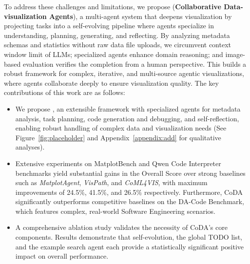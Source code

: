 To address these challenges and limitations, we propose \methodname{} (\textbf{\textcolor{StarIndigo}{Collaborative} \textcolor{StarCoral}{Data-visualization} \textcolor{StarTeal}{Agents}}), a multi-agent system that deepens visualization by projecting tasks into a self-evolving pipeline where agents specialize in understanding, planning, generating, and reflecting. 
By analyzing metadata schemas and statistics without raw data file uploads, we circumvent context window limit of LLMs; specialized agents enhance domain reasoning; and image-based evaluation verifies the completion from a human perspective. This builds a robust framework for complex, iterative, and multi-source agentic visualizations, where agents collaborate deeply to ensure visualization quality.
The key contributions of this work are as follows:
\begin{itemize}[itemsep=0pt, parsep=0pt, topsep=0pt, leftmargin=2em]
    \item We propose \methodname{}, an extensible framework with specialized agents for metadata analysis, task planning, code generation and debugging, and self-reflection, enabling robust handling of complex data and visualization needs (See Figure~\ref{fig:placeholder} and Appendix~\ref{appendix:add} for qualitative analyses).
    \item Extensive experiments on MatplotBench and Qwen Code Interpreter benchmarks yield substantial gains in the Overall Score over strong baselines such as \textit{MatplotAgent}, \textit{VisPath}, and \textit{CoML4VIS}, with maximum improvements of 24.5\%, 41.5\%, and 26.5\% respectively. Furthermore, CoDA significantly outperforms competitive baselines on the DA-Code Benchmark, which features complex, real-world Software Engineering scenarios.
    \item A comprehensive ablation study validates the necessity of CoDA's core components. Results demonstrate that self-evolution, the global TODO list, and the example search agent each provide a statistically significant positive impact on overall performance.
\end{itemize}

